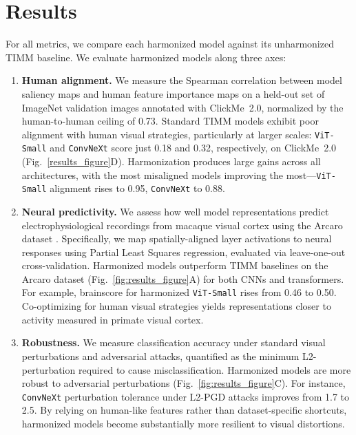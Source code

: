 \documentclass[submission]{ccn}
\begin{document}
\section{Results}
For all metrics, we compare each harmonized model against its unharmonized TIMM baseline. We evaluate harmonized models along three axes:
\begin{enumerate}
  \item \textbf{Human alignment.} We measure the Spearman correlation between model saliency maps and human feature importance maps on a held-out set of ImageNet validation images annotated with ClickMe~2.0, normalized by the human-to-human ceiling of 0.73. Standard TIMM models exhibit poor alignment with human visual strategies, particularly at larger scales: \texttt{ViT-Small} and \texttt{ConvNeXt} score just 0.18 and 0.32, respectively, on ClickMe~2.0 (Fig.~\ref{results_figure}D). Harmonization produces large gains across all architectures, with the most misaligned models improving the most---\texttt{ViT-Small} alignment rises to 0.95, \texttt{ConvNeXt} to 0.88.
  \item \textbf{Neural predictivity.} We assess how well model representations predict electrophysiological recordings from macaque visual cortex using the Arcaro dataset \citep{Arcaro}. Specifically, we map spatially-aligned layer activations to neural responses using Partial Least Squares regression, evaluated via leave-one-out cross-validation. Harmonized models outperform TIMM baselines on the Arcaro dataset (Fig.~\ref{fig:results_figure}A) for both CNNs and transformers. For example, brainscore for harmonized \texttt{ViT-Small} rises from 0.46 to 0.50. Co-optimizing for human visual strategies yields representations closer to activity measured in primate visual cortex.
  \item \textbf{Robustness.} We measure classification accuracy under standard visual perturbations and adversarial attacks, quantified as the minimum L2-perturbation required to cause misclassification. Harmonized models are more robust to adversarial perturbations (Fig.~\ref{fig:results_figure}C). For instance, \texttt{ConvNeXt} perturbation tolerance under L2-PGD attacks improves from 1.7 to 2.5. By relying on human-like features rather than dataset-specific shortcuts, harmonized models become substantially more resilient to visual distortions.
\end{enumerate}
\end{document}
